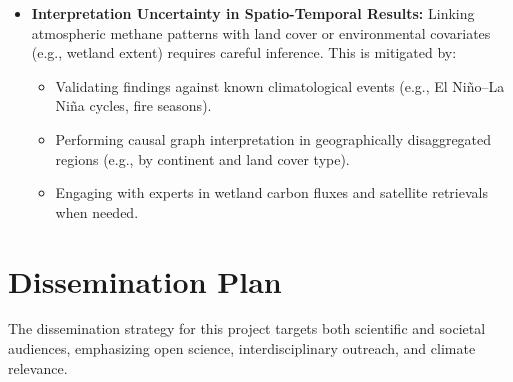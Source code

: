 \begin{itemize}
    \item \textbf{Interpretation Uncertainty in Spatio-Temporal Results:} Linking atmospheric methane patterns with land cover or environmental covariates (e.g., wetland extent) requires careful inference. This is mitigated by:
    \begin{itemize}
        \item Validating findings against known climatological events (e.g., El Niño–La Niña cycles, fire seasons).
        \item Performing causal graph interpretation in geographically disaggregated regions (e.g., by continent and land cover type).
        \item Engaging with experts in wetland carbon fluxes and satellite retrievals when needed.
    \end{itemize}
\end{itemize}


\section{Dissemination Plan}

The dissemination strategy for this project targets both scientific and societal audiences, emphasizing open science, interdisciplinary outreach, and climate relevance.


